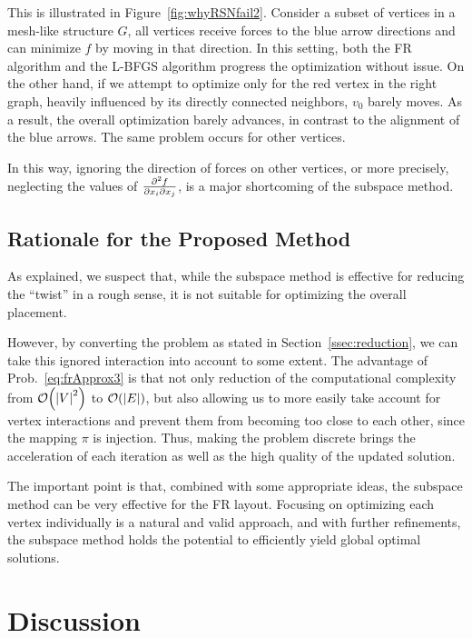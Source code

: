\documentclass[dvipdfmx,10pt,journal,compsoc]{IEEEtran}
\begin{document}
This is illustrated in Figure~\ref{fig:whyRSNfail2}.
Consider a subset of vertices in a mesh-like structure $G$, all vertices receive forces to the blue arrow directions and can minimize $f$ by moving in that direction.
In this setting, both the FR algorithm and the L-BFGS algorithm progress the optimization without issue.
On the other hand, if we attempt to optimize only for the red vertex in the right graph, heavily influenced by its directly connected neighbors, $v_0$ barely moves.
As a result, the overall optimization barely advances, in contrast to the alignment of the blue arrows.
The same problem occurs for other vertices.

In this way, ignoring the direction of forces on other vertices, or more precisely, neglecting the values of $\pdv{f}{x_i}{x_j}$, is a major shortcoming of the subspace method.

\subsection{Rationale for the Proposed Method}\label{ssec:rationale}

As explained, we suspect that, while the subspace method is effective for reducing the ``twist'' in a rough sense, it is not suitable for optimizing the overall placement.

However, by converting the problem as stated in Section~\ref{ssec:reduction}, we can take this ignored interaction into account to some extent.
The advantage of Prob.~\eqref{eq:frApprox3} is that not only reduction of the computational complexity from $\order{\abs{V}^2}$ to $\order{\abs{E}}$, but also allowing us to more easily take account for vertex interactions and prevent them from becoming too close to each other, since the mapping $\pi$ is injection.
Thus, making the problem discrete brings the acceleration of each iteration as well as the high quality of the updated solution.

The important point is that, combined with some appropriate ideas, the subspace method can be very effective for the FR layout.
Focusing on optimizing each vertex individually is a natural and valid approach, and with further refinements, the subspace method holds the potential to efficiently yield global optimal solutions.

\section{Discussion} \label{sec:discussion}
\end{document}
